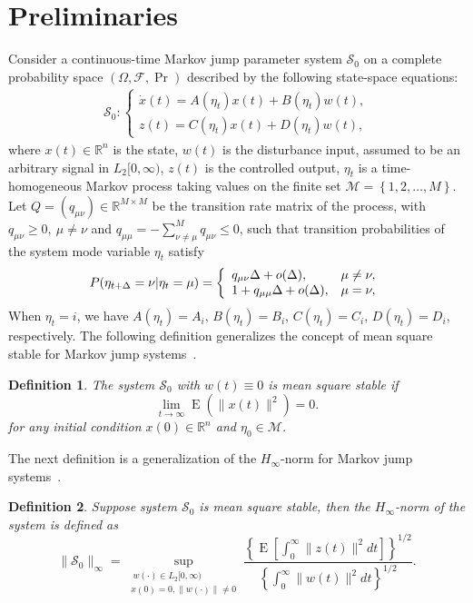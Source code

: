 \documentclass[11pt,draftcls,onecolumn]{IEEEtran}
\DeclareMathOperator{\E}{E}
\newcommand{\set}[1]{\left\{#1\right\}}
\newtheorem{definition}{Definition}
\begin{document}
\section{Preliminaries}
Consider a continuous-time  Markov jump parameter system $\mathcal{S}_0$ on a complete probability space $(\Omega,\mathcal{F},\Pr)$ described by the following state-space equations:
\begin{align*}
\mathcal{S}_0:\left\{
\begin{array}{l}
\dot{x}(t)=A(\eta_t)x(t)+B(\eta_t)w(t),\\
z(t)=C(\eta_t)x(t)+D(\eta_t)w(t),
\end{array}
\right.
\end{align*}
where $x(t)\in\mathbb{R}^n$ is the state, $w(t)$ is the disturbance input, assumed to be an arbitrary signal in $L_2[0,\infty)$, $z(t)$ is the controlled output,  $\eta_t$ is a time-homogeneous Markov process  taking values on the finite set $\mathcal{M}=\set{1,2,\ldots,M}$. Let $Q=(q_{\mu\nu})\in\mathbb{R}^{M\times M}$ be the transition rate matrix of the process, with $q_{\mu\nu}\geqslant 0,~\mu\neq \nu$ and $q_{\mu\mu}=-\sum_{\nu\neq \mu}^{M} q_{\mu\nu}\leqslant 0$, such that transition probabilities of the system mode variable $\eta_t$ satisfy
\begin{equation*}
P(\eta_{t+\Delta} =\nu |\eta_t=\mu)=\left\{
\begin{array}{l l}
q_{\mu\nu}\Delta+o(\Delta), &\mu\neq \nu,\\
1+q_{\mu\mu}\Delta+o(\Delta), &\mu =\nu,
\end{array}
\right.
\end{equation*}
 When $\eta_t=i$, we have $A(\eta_t)=A_i$, $B(\eta_t)=B_i$, $C(\eta_t)=C_i$, $D(\eta_t)=D_i$, respectively. The following definition generalizes the concept of   mean square stable for Markov jump systems~\cite{Farias1992}.


\begin{definition}
The system $\mathcal{S}_0$ with $w(t) \equiv 0$ is mean square stable  if
\begin{equation*}
\lim_{t\rightarrow \infty}\E(\|x(t)\|^2)=0.
\end{equation*}
for any initial condition $x(0)\in\mathbb{R}^n$ and  $\eta_0\in\mathcal{M}$.
\end{definition}
The next definition is a generalization of  the $H_{\infty}$-norm for  Markov jump systems~\cite{Fagoso1993}.
\begin{definition}
Suppose system $\mathcal{S}_0$ is mean square stable, then the $H_{\infty}$-norm of the system is defined as
 \begin{equation*}
\|\mathcal{S}_0\|_{\infty}=\sup_{\substack{ \ w(\cdot) \in L_2[0,\infty) \\x(0)=0, \|w(\cdot)\|\neq 0}} \frac{\left\{\E\left[\int_0^{\infty}\|z(t)\|^2dt\right]\right\}^{1/2}}{\left\{\int_0^{\infty}\|w(t)\|^2dt\right\}^{1/2}}.
\end{equation*}

\end{definition}
\end{document}
